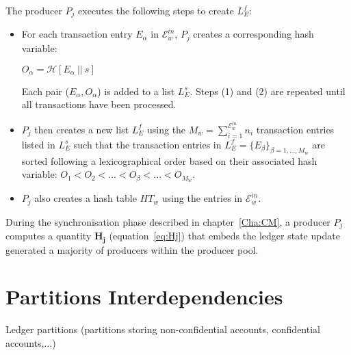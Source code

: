 The producer $P_j$ executes the following steps to create $L_E^f$:
\begin{itemize}
\item For each transaction entry $E_\alpha$ in $\mathcal{E}^{in}_w$, $P_j$ creates a corresponding hash variable: 
\begin{center}
$O_\alpha = \mathcal{H}[E_\alpha~||~s]$
\end{center}
Each pair ($E_\alpha,O_\alpha$) is added to a list $L^s_E$. Steps (1) and (2) are repeated until all transactions have been processed.
\item	$P_j$ then creates a new list $L^f_E$ using the $M_w=\sum_{i=1}^{\mathcal{E}^{in}_w}n_i$ transaction entries listed in $L^s_E$ such that the transaction entries in $L^f_E = \{E_\beta\}_{\beta=1,...,M_w}$ are sorted following a lexicographical order based on their associated hash variable: $O_1 < O_2 < ... < O_\beta < ... < O_{M_w}$. 
\item $P_j$ also creates a hash table $HT_w$ using the entries in $\mathcal{E}^{in}_w$.
\end{itemize}







During the synchronisation phase described in chapter~\ref{Cha:CM}, a producer $P_j$ computes a quantity $\mathbf{H_{j}}$ (equation~\eqref{eq:Hj})  that embeds the ledger state update generated a majority of producers within the producer pool. 

\section{Partitions Interdependencies}

Ledger partitions (partitions storing non-confidential accounts, confidential accounts,...)